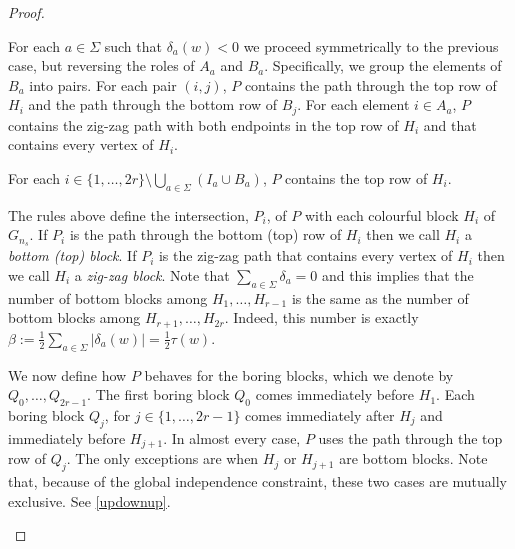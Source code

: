 \documentclass{patmorin}
\begin{document}
\begin{proof}
\begin{compactenum}
        \item For each $a\in\Sigma$ such that $\delta_a(w)<0$ we proceed symmetrically to the previous case, but reversing the roles of $A_a$ and $B_a$.  Specifically, we group the elements of $B_a$ into pairs.  For each pair $(i,j)$, $P$ contains the path through the top row of $H_i$ and the path through the bottom row of $B_j$.  For each element $i\in A_a$, $P$ contains the zig-zag path with both endpoints in the top row of $H_i$ and that contains every vertex of $H_i$.

        \item For each $i\in\{1,\ldots,2r\}\setminus\bigcup_{a\in\Sigma}(I_a\cup B_a)$, $P$ contains the top row of $H_i$.
    \end{compactenum}
    The rules above define the intersection, $P_i$, of $P$ with each colourful block $H_i$ of $G_{n_s}$.  If $P_i$ is the path through the bottom (top) row of $H_i$ then we call $H_i$ a \emph{bottom (top) block}.  If $P_i$ is the zig-zag path that contains every vertex of $H_i$ then we call $H_i$ a \emph{zig-zag block}.  Note that $\sum_{a\in\Sigma} \delta_a = 0$ and this implies that the number of bottom blocks among $H_1,\ldots,H_{r-1}$ is the same as the number of bottom blocks among $H_{r+1},\ldots,H_{2r}$.  Indeed, this number is exactly $\beta:=\tfrac{1}{2}\sum_{a\in\Sigma} |\delta_a(w)|=\tfrac{1}{2}\tau(w)$.

    We now define how $P$ behaves for the boring blocks, which we denote by  $Q_0,\ldots,Q_{2r-1}$. The first boring block $Q_0$ comes immediately before $H_1$. Each boring block $Q_j$, for $j\in\{1,\ldots,2r-1\}$ comes immediately after $H_j$ and immediately before $H_{j+1}$.  In almost every case, $P$ uses the path through the top row of $Q_j$.  The only exceptions are when $H_j$ or $H_{j+1}$ are bottom blocks. Note that, because of the global independence constraint, these two cases are mutually exclusive. See \cref{updownup}.

    \begin{figure}
    \end{figure}


\end{proof}
\end{document}
